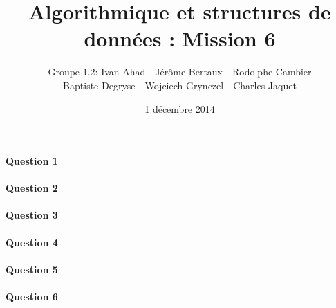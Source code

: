\documentclass[a4paper]{article}
\title{Algorithmique et structures de données : Mission 6}
\date{1 décembre 2014}
\author{Groupe 1.2: Ivan Ahad - Jérôme Bertaux - Rodolphe Cambier \\ 
	Baptiste Degryse - Wojciech Grynczel - Charles Jaquet}
\begin{document}
\maketitle
\paragraph{Question 1}

\paragraph{Question 2}

\paragraph{Question 3}

\paragraph{Question 4}

\paragraph{Question 5}

\paragraph{Question 6}
\end{document}
